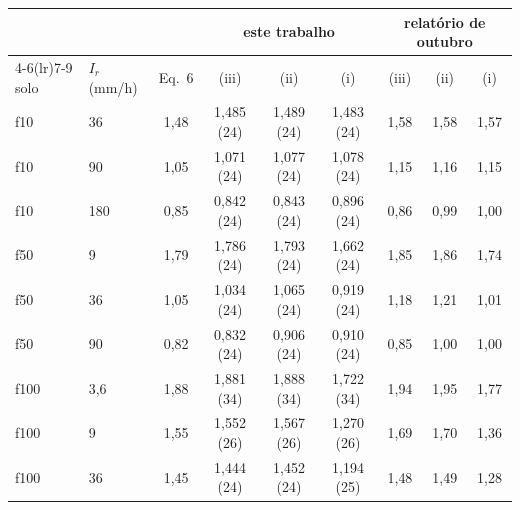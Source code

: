 \begin{tabular}{llccccccc}
\toprule
 & & & \multicolumn{3}{c}{este trabalho} & \multicolumn{3}{c}{relatório de outubro}\\
\cmidrule(lr){4-6}\cmidrule(lr){7-9}
solo & $I_r$ (mm/h) & Eq.~6 & (iii) & (ii) & (i) & (iii) & (ii) & (i)\\
\midrule
f10 & 36 & 1{,}48 & 1{,}485 (24) & 1{,}489 (24) & 1{,}483 (24) & 1{,}58 & 1{,}58 & 1{,}57\\
f10 & 90 & 1{,}05 & 1{,}071 (24) & 1{,}077 (24) & 1{,}078 (24) & 1{,}15 & 1{,}16 & 1{,}15\\
f10 & 180 & 0{,}85 & 0{,}842 (24) & 0{,}843 (24) & 0{,}896 (24) & 0{,}86 & 0{,}99 & 1{,}00\\
\midrule
f50 & 9 & 1{,}79 & 1{,}786 (24) & 1{,}793 (24) & 1{,}662 (24) & 1{,}85 & 1{,}86 & 1{,}74\\
f50 & 36 & 1{,}05 & 1{,}034 (24) & 1{,}065 (24) & 0{,}919 (24) & 1{,}18 & 1{,}21 & 1{,}01\\
f50 & 90 & 0{,}82 & 0{,}832 (24) & 0{,}906 (24) & 0{,}910 (24) & 0{,}85 & 1{,}00 & 1{,}00\\
\midrule
f100 & 3{,}6 & 1{,}88 & 1{,}881 (34) & 1{,}888 (34) & 1{,}722 (34) & 1{,}94 & 1{,}95 & 1{,}77\\
f100 & 9 & 1{,}55 & 1{,}552 (26) & 1{,}567 (26) & 1{,}270 (26) & 1{,}69 & 1{,}70 & 1{,}36\\
f100 & 36 & 1{,}45 & 1{,}444 (24) & 1{,}452 (24) & 1{,}194 (25) & 1{,}48 & 1{,}49 & 1{,}28\\
\bottomrule
\end{tabular}
